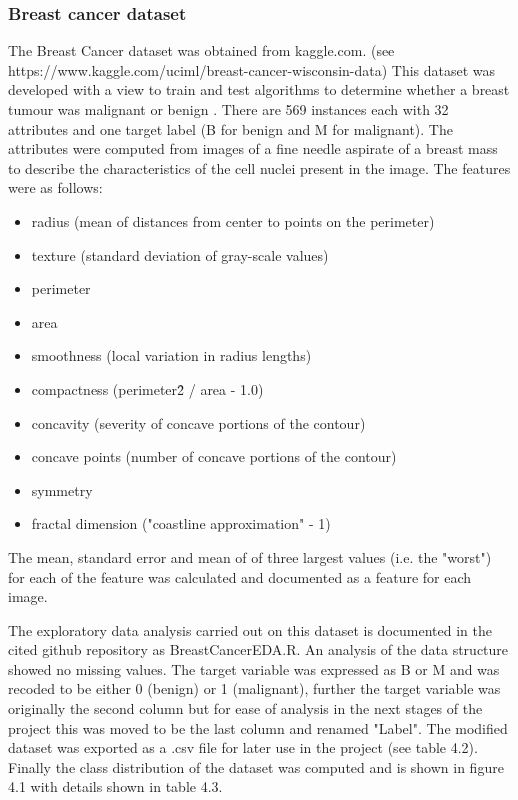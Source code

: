 \subsubsection{Breast cancer dataset}
The Breast Cancer dataset was obtained from kaggle.com. \newline
(see https://www.kaggle.com/uciml/breast-cancer-wisconsin-data) \newline
This dataset was developed with a view to train and test algorithms to determine whether a breast tumour was malignant or benign \citep{OLMangasarian:1994ue}. \newline
There are  569 instances each with 32 attributes and one target label (B for benign and M for malignant).\newline
The attributes were computed from images of a fine needle aspirate of a breast mass to describe the characteristics of the cell nuclei present in the image. The features were as follows:
\begin{itemize}
    \item radius (mean of distances from center to points on the perimeter)
    \item texture (standard deviation of gray-scale values) 
    \item perimeter 
    \item area 
    \item smoothness (local variation in radius lengths) 
    \item compactness (perimeter\^2 / area - 1.0)
    \item concavity (severity of concave portions of the contour)
    \item concave points (number of concave portions of the contour)
    \item symmetry
    \item fractal dimension ("coastline approximation" - 1)
\end{itemize}
The mean, standard error and mean of of three largest values (i.e. the "worst") for each of the feature was calculated and documented as a feature for each image.\newline

The exploratory data analysis carried out on this dataset is documented in the cited github repository as BreastCancerEDA.R.\newline
An analysis of the data structure showed no missing values. The target variable was expressed as B or M and was recoded to be either 0 (benign) or 1 (malignant), further the target variable was originally the second column but for ease of analysis in the next stages of the project this was moved to be the last column and renamed "Label".\newline
The modified dataset was exported as a .csv file for later use in the project (see table 4.2).\newline
Finally the class distribution of the dataset was computed and is shown in figure 4.1 with details shown in table 4.3.\newline 


